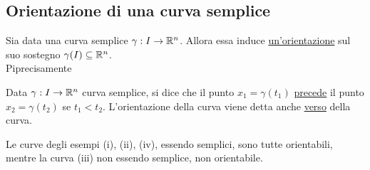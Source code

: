 \subsection{Orientazione di una curva semplice}
Sia data una curva semplice $\gamma:I\to\mathbb{R}^n$. Allora 
essa induce \underline{un'orientazione} sul suo sostegno $\gamma(I) \subseteq \mathbb{R}^n$. \\
Pi\acu precisamente
\begin{definition}
  Data $\gamma:I\to\mathbb{R}^n$ curva semplice, si dice che il punto $x_1 = \gamma(t_1)$ \underline{precede}
  il punto $x_2 = \gamma(t_2)$ se $t_1 < t_2$. L'orientazione della curva viene detta
  anche \underline{verso} della curva.
\end{definition}
\begin{example}
  Le curve degli esempi (i), (ii), (iv), essendo semplici, sono tutte orientabili, mentre 
  la curva (iii) non essendo semplice, non \ace orientabile.
\end{example}
